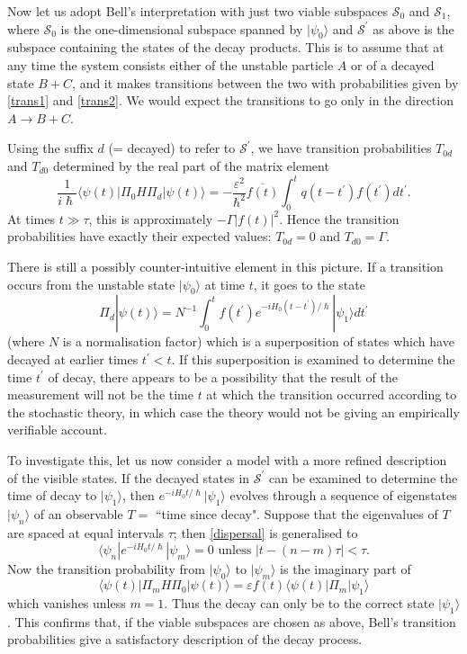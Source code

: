 \documentclass[12pt,a4paper,reqno]{article}
\renewcommand{\(}{\left(}
\renewcommand{\)}{\right)}
\renewcommand{\hbar}{\hslash}
\renewcommand{\S}{\mathcal{S}}
\newcommand{\<}{\langle}
\renewcommand{\>}{\rangle}
\theoremstyle{plain} %
\theoremstyle{definition}
\theoremstyle{remark}
\begin{document}
Now let us adopt Bell's interpretation with just two viable subspaces
$\S_0$ and $\S_1$, where $\S_0$ is the one-dimensional subspace 
spanned by $|\psi_0\>$ and $\S^\prime$ as above is the subspace
containing the states of the decay products. This is to assume that at
any time the system consists either of the unstable particle $A$ or of a
decayed state $B+C$, and it makes transitions between the two with
probabilities given by \eqref{trans1} and \eqref{trans2}. We would expect the
transitions to go only in the direction $A\rightarrow B+C$. 

Using the suffix $d$ (= decayed) to refer to $\S^\prime$, we have
transition probabilities $T_{0d}$ and $T_{d0}$ determined by the real
part of the matrix element 
\[
\frac{1}{i\hbar}\<\psi(t)|\Pi_0 H \Pi_d|\psi(t)\> =
-\frac{\varepsilon^2}{\hbar^2}\overline{f(t)}\int_0^t
q(t-t^\prime)f(t^\prime)dt^\prime.
\]
At times $t\gg\tau$, this is approximately $-\Gamma|f(t)|^2$. Hence the transition
probabilities have exactly their expected values: $T_{0d}=0$ and
$T_{d0}=\Gamma$.

There is still a possibly counter-intuitive element in this picture. If
a transition occurs from the unstable state $|\psi_0\>$ at time $t$, it
goes to the state 
\[
\Pi_d|\psi(t)\> = N^{-1}\int_0^t
f(t^\prime)e^{-iH_0(t-t^\prime)/\hbar}|\psi_1\>dt^\prime
\]
(where $N$ is a normalisation factor) which is a superposition of states
which have decayed at earlier times $t^\prime < t$. If this
superposition is examined to determine the time $t^\prime$ of decay,
there appears to be a possibility that the result of the measurement
will not be the time $t$ at which the transition occurred according to
the stochastic theory, in which case the theory would not be giving an
empirically verifiable account. 

To investigate this, let us now consider a model with a more refined
description of the visible states. If the decayed states in $\S^\prime$
can be examined to determine the time of decay to $|\psi_1\>$, then
$e^{-iH_0t/\hbar}|\psi_1\>$ evolves through a sequence of eigenstates
$|\psi_n\>$ of an observable $T =$ ``time since decay". Suppose that
the eigenvalues of $T$ are spaced at equal intervals $\tau$; then
\eqref{dispersal} is generalised to 
\begin{equation}
\<\psi_n|e^{-iH_0t/\hbar}|\psi_m\> = 0 \text{  unless  } |t - (n-m)\tau|<\tau. 
\end{equation}
Now the transition probability from $|\psi_0\>$ to $|\psi_m\>$ is the
imaginary part of 
\[ 
\<\psi(t)|\Pi_m H \Pi_0|\psi(t)\> = \varepsilon
f(t)\<\psi(t)|\Pi_m|\psi_1\>
\]
which vanishes unless $m=1$. Thus the decay can only be to the correct
state $|\psi_1\>$. This confirms that, if the viable
subspaces are chosen as above, Bell's transition probabilities
give a satisfactory description of the decay process.
\end{document}
